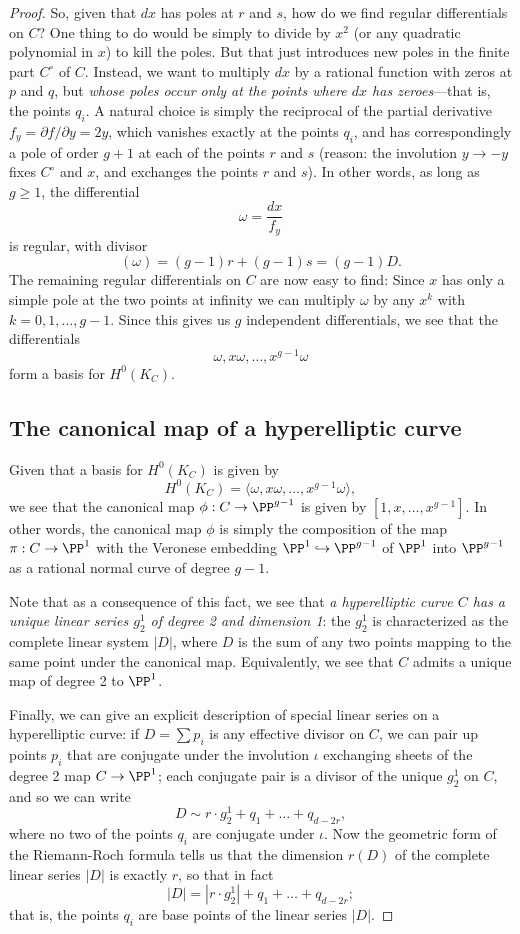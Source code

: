 \begin{proof}
So, given that $dx$ has poles at $r$ and $s$, how do we find regular differentials on $C$? One thing to do would be simply to divide by $x^2$ (or any quadratic polynomial in $x$) to kill the poles. But that just introduces new poles in the finite part $C^\circ$ of $C$. Instead, we want to multiply $dx$ by a rational function with zeros at $p$ and $q$, but \emph{whose poles occur only at the points where $dx$ has zeroes}---that is, the points $q_i$.  A natural choice is simply the reciprocal of the partial derivative $f_y = \partial f/ \partial y = 2y$, which vanishes exactly at the points $q_i$, and has correspondingly a pole of order $g+1$ at each of the points $r$ and $s$ (reason: the involution $y\to -y$ fixes $C^\circ$ and $x$, and exchanges the points $r$ and $s$). In other words, as long as $g \geq 1$, the differential
$$
\omega = \frac{dx}{f_y}
$$
is regular, with divisor
$$
(\omega) = (g-1)r + (g-1)s = (g-1)D.
$$
The remaining regular differentials on $C$ are now easy to find: Since $x$ has only a simple pole
at the two points at infinity we can  multiply $\omega$ by any $x^k$ with $k = 0, 1, \dots, g-1$. Since this gives us $g$ independent differentials, we see that the differentials
$$
\omega, x\omega, \dots, x^{g-1}\omega
$$
  form a basis for $H^0(K_C)$.

\subsection{The canonical map of a hyperelliptic curve}\label{hyperelliptic special}

Given that a basis for $H^0(K_C)$ is given by 
$$
H^0(K_C) = \langle \omega, x\omega,\dots,x^{g-1}\omega \rangle,
$$
we see that the canonical map $\phi : C \to \PP^{g-1}$ is given by $[1,x,\dots,x^{g-1}]$. In other words, the canonical map $\phi$ is simply the composition of the map $\pi : C \to \PP^1$ with the Veronese embedding $\PP^1 \hookrightarrow \PP^{g-1}$ of $\PP^1$ into $\PP^{g-1}$ as a rational normal curve of degree $g-1$.

Note that as a consequence of this fact, we see that \emph{a hyperelliptic curve $C$ has a \emph{unique} linear series $g^1_2$ of degree 2 and dimension 1}: the $g^1_2$ is characterized as the complete linear system $|D|$, where $D$ is the sum of any two points mapping to the same point under the canonical map. Equivalently, we see that $C$ admits  a unique map of degree 2 to $\PP^1$. 

Finally, we can give an explicit description of special linear series on a hyperelliptic curve: if $D = \sum p_i$ is any effective divisor on $C$, we can pair up points $p_i$ that are conjugate under the involution $\iota$ exchanging sheets of the degree 2 map $C \to \PP^1$; each conjugate pair is a divisor of the unique $g^1_2$ on $C$, and so we can write
$$
D \sim r\cdot g^1_2 + q_1 + \dots + q_{d-2r},
$$
where no two of the points $q_i$ are conjugate under $\iota$. Now the geometric form of the Riemann-Roch formula tells us that the dimension $r(D)$ of the complete linear series $|D|$ is exactly $r$, so that in fact 
$$
|D| = |r\cdot g^1_2| + q_1 + \dots + q_{d-2r};
$$
that is, the points $q_i$ are base points of the linear series $|D|$.


\end{proof}
